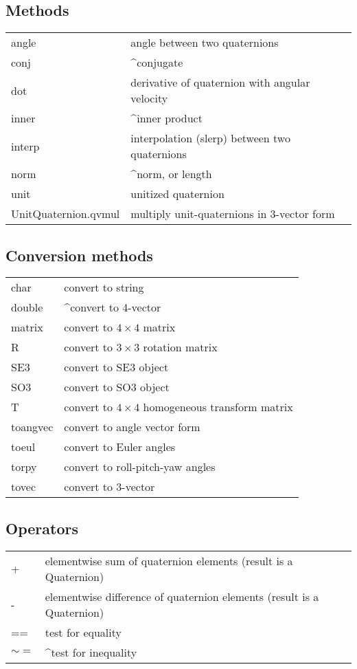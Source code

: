 \subsection*{Methods}
\begin{longtable}{lp{120mm}}
angle & angle between two quaternions\\ 
conj & \textasciicircum conjugate\\ 
dot & derivative of quaternion with angular velocity\\ 
inner & \textasciicircum inner product\\ 
interp & interpolation (slerp) between two quaternions\\ 
norm & \textasciicircum norm, or length\\ 
unit & unitized quaternion\\ 
UnitQuaternion.qvmul & multiply unit-quaternions in 3-vector form\\ 
\end{longtable}\vspace{1ex}

\subsection*{Conversion methods}
\begin{longtable}{lp{120mm}}
char & convert to string\\ 
double & \textasciicircum convert to 4-vector\\ 
matrix & convert to $4 \times 4$ matrix\\ 
R & convert to $3 \times 3$ rotation matrix\\ 
SE3 & convert to SE3 object\\ 
SO3 & convert to SO3 object\\ 
T & convert to $4 \times 4$ homogeneous transform matrix\\ 
toangvec & convert to angle vector form\\ 
toeul & convert to Euler angles\\ 
torpy & convert to roll-pitch-yaw angles\\ 
tovec & convert to 3-vector\\ 
\end{longtable}\vspace{1ex}

\subsection*{Operators}
\begin{longtable}{lp{120mm}}
+ & elementwise sum of quaternion elements (result is a Quaternion)\\ 
- & elementwise difference of quaternion elements (result is a Quaternion)\\ 
== & test for equality\\ 
$\sim=$ & \textasciicircum test for inequality\\ 
\end{longtable}\vspace{1ex}


